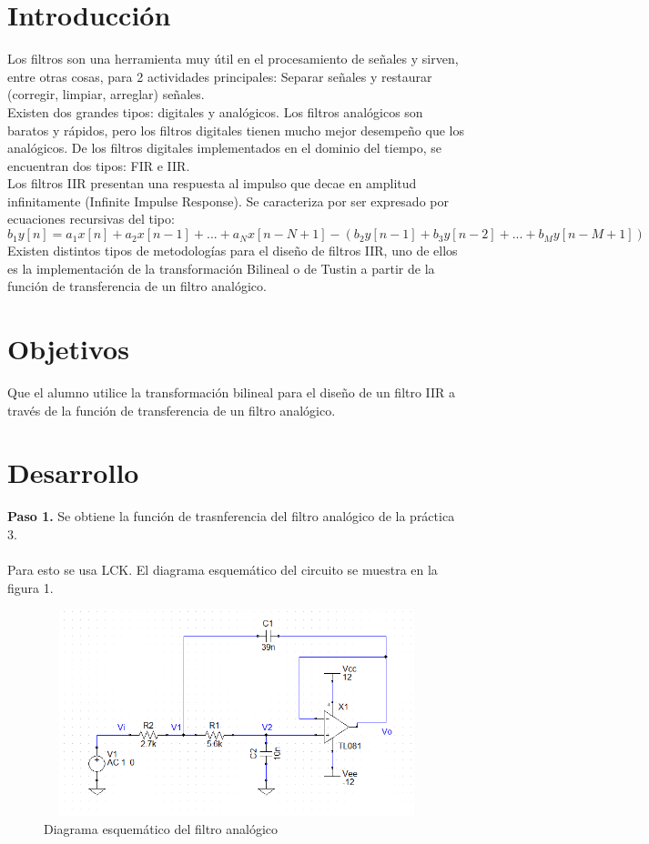 \documentclass[12pt]{article}
\begin{document}

\newpage

\section{Introducción}
Los filtros son una herramienta muy útil en el procesamiento de señales y sirven, entre otras cosas, para 2 actividades principales: Separar señales y restaurar (corregir, limpiar, arreglar) señales.
\\
Existen dos grandes tipos: digitales y analógicos. Los filtros analógicos son baratos y rápidos, pero los filtros digitales tienen mucho mejor desempeño que los analógicos. De los filtros digitales implementados en el dominio del tiempo, se encuentran dos tipos: FIR e IIR.
\\
Los filtros IIR presentan una respuesta al impulso que decae en amplitud infinitamente (Infinite Impulse Response). Se caracteriza por ser expresado por ecuaciones recursivas del tipo:
$$b_1y[n] = a_1 x[n] +a_2 x[n-1]  + ... + a_N x[n-N+1]-(b_2y[n-1]+b_3y[n-2]+...+b_My[n-M+1])$$
Existen distintos tipos de metodologías para el diseño de filtros IIR, uno de ellos es la implementación de la transformación Bilineal o de Tustin a partir de la función de transferencia de un filtro analógico.

\section{Objetivos}
Que el alumno utilice la transformación bilineal para el diseño de un filtro IIR a través de la función de transferencia de un filtro analógico.

\section{Desarrollo}
\textbf{Paso 1.} Se obtiene la función de trasnferencia del filtro analógico de la práctica 3.\\\\ Para esto se usa LCK. El diagrama esquemático del circuito se muestra en la figura 1.

\begin{figure}[h]
        \centering
        \includegraphics[width=14cm, height=6cm]{im4.PNG}
        \caption{Diagrama esquemático del filtro analógico}
\end{figure}
\end{document}
